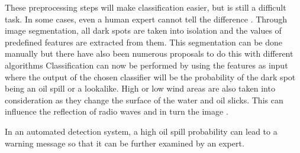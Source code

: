 These preprocessing steps will make classification easier, but is still a difficult task. In some cases, even a human expert cannot tell the difference \cite{Keramitsoglou2006640}. Through image segmentation, all dark spots are taken into isolation and the values of predefined features are extracted from them. This segmentation can be done manually but there have also been numerous proposals to do this with different algorithms \cite{ma2011sar,fjortoft1998optimal, ye2002wavelet} Classification can now be performed by using the features as input where the output of the chosen classifier will be the probability of the dark spot being an oil spill or a lookalike. 
High or low wind areas are also taken into consideration as they change the surface of the water and oil slicks. This can influence the reflection of radio waves and in turn the image \cite{fingas2014review}.

In an automated detection system, a high oil spill probability can lead to a warning message so that it can be further examined by an expert.


